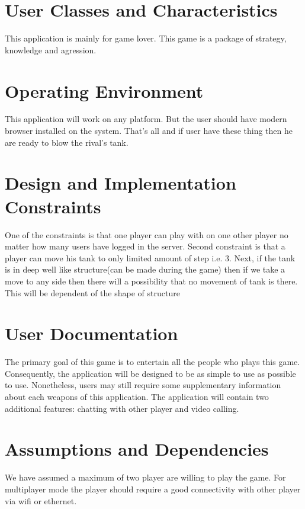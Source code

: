 \documentclass{scrreprt}
\begin{document}
\section{User Classes and Characteristics}
$ $This application is mainly for game lover. This game is a package of strategy, knowledge and agression. $ $

\section{Operating Environment}
$ $This application will work on any platform. But the user should have modern browser installed on the system. That's all and if user have these thing then he are ready to blow the rival's tank.$ $

\section{Design and Implementation Constraints}
$ $One of the constraints is that one player can play with on one other player no matter how many users have logged in the server. Second constraint is that a player can move his tank to only limited amount of step i.e. 3. Next, if the tank is in deep well like structure(can be made during the game) then if we take a move to any side then there will a possibility that no movement of tank is there. This will be dependent of the shape of structure$ $

\section{User Documentation}
$ $The primary goal of this game is to entertain all the people who plays this game. 
Consequently, the application will be designed to be as simple to use as possible to use. Nonetheless, users may still require some supplementary information about each weapons of this application. The application will contain two additional features: chatting with other player and video calling. $ $

\section{Assumptions and Dependencies}

$ $We have assumed a maximum of two player are willing to play the game. For multiplayer mode the player should require a good connectivity with other player via wifi or ethernet.$ $
\end{document}
